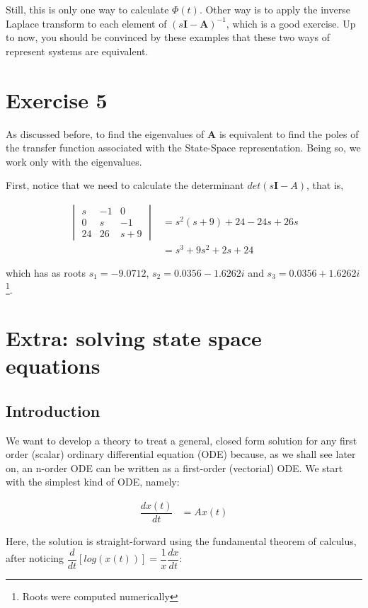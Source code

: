 \documentclass[12pt]{article}
\begin{document}
		Still, this is only one way to calculate $\Phi(t)$. Other way is to apply the inverse Laplace transform to each element of $(s\mathbf{I}-\mathbf{A})^{-1}$, which is a good exercise. Up to now, you should be convinced by these examples that these two ways of represent systems are equivalent.
		
	\section{Exercise 5}
		As discussed before, to find the eigenvalues of $\mathbf{A}$ is equivalent to find the poles of the transfer function associated with the State-Space representation. Being so, we work only with the eigenvalues.
		
		First, notice that we need to calculate the determinant $det(s\mathbf{I}-A)$, that is,
		
		\begin{align*}
			\begin{vmatrix}
				s & -1 & 0\\
				0 & s & -1\\
				24 & 26 & s+9
			\end{vmatrix} &= s^{2}(s+9) + 24 - 24s + 26s\\
						&= s^{3} + 9s^{2} + 2s + 24
		\end{align*}
		
		which has as roots $s_{1} = -9.0712$, $s_{2} = 0.0356 - 1.6262i$ and $s_{3} = 0.0356 + 1.6262i$\footnote{Roots were computed numerically}.
	\section{Extra: solving state space equations}
		\subsection{Introduction}
		We want to develop a theory to treat a general, closed form solution for any  first order (scalar) ordinary differential equation (ODE) because, as we shall see later on, an n-order ODE can be written as a first-order (vectorial) ODE. We start with the simplest kind of ODE, namely:
		
		\begin{align}
		\dfrac{dx(t)}{dt} &= Ax(t) \label{Equation 1}
		\end{align}
		
		Here, the solution is straight-forward using the fundamental theorem of calculus, after noticing $\dfrac{d}{dt}[log(x(t))] = \dfrac{1}{x}\dfrac{dx}{dt}$:
		
\end{document}
